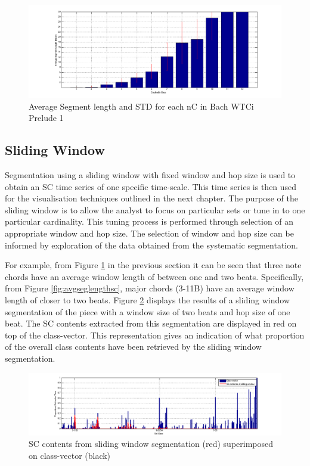 \documentclass{article}
\begin{document}
\begin{figure}[htb]
\centering
\includegraphics[scale=0.25]{../plots/avgseglengthcard.png}
\caption{\label{fig:avgseglengthcard}Average Segment length and STD for each nC in Bach WTCi Prelude 1}
\end{figure}
\subsection{Sliding Window}
\label{sec-8-2}

Segmentation using a sliding window with fixed window and hop size is
used to obtain an SC time series of one specific time-scale. This time
series is then used for the visualisation techniques outlined in the
next chapter. The purpose of the sliding window is to allow the
analyst to focus on particular sets or tune in to one particular
cardinality. This tuning process is performed through selection of an
appropriate window and hop size. The selection of window and hop size
can be informed by exploration of the data obtained from the
systematic segmentation.

For example, from Figure \ref{fig:avgseglengthcard} in the previous
section it can be seen that three note chords have an average window
length of between one and two beats. Specifically, from Figure
\ref{fig:avgseglengthsc}, major chords (3-11B) have an average window
length of closer to two beats. Figure \ref{fig:cvplusswseg} displays
the results of a sliding window segmentation of the piece with a
window size of two beats and hop size of one beat. The SC contents
extracted from this segmentation are displayed in red on top of the
class-vector. This representation gives an indication of what
proportion of the overall class contents have been retrieved by the
sliding window segmentation.

\begin{figure}[htb]
\centering
\includegraphics[scale=0.35]{../plots/classvecclasshist.png}
\caption{\label{fig:cvplusswseg}SC contents from sliding window segmentation (red) superimposed on class-vector (black)}
\end{figure}
\end{document}
